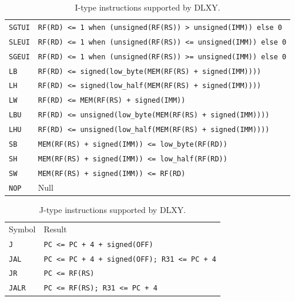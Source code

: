 \begin{table}[ht]
\begin{tabular}{ll}
		\rowcolor{gray!25}
		\texttt{SGTUI} & \texttt{RF(RD) <= 1 when (unsigned(RF(RS)) > unsigned(IMM)) else 0} \\
		\texttt{SLEUI} & \texttt{RF(RD) <= 1 when (unsigned(RF(RS)) <= unsigned(IMM)) else 0} \\
		\rowcolor{gray!25}
		\texttt{SGEUI} & \texttt{RF(RD) <= 1 when (unsigned(RF(RS)) >= unsigned(IMM)) else 0} \\
		\texttt{LB} & \texttt{RF(RD) <= signed(low\_byte(MEM(RF(RS) + signed(IMM))))} \\
		\rowcolor{gray!25}
		\texttt{LH} & \texttt{RF(RD) <= signed(low\_half(MEM(RF(RS) + signed(IMM))))} \\
		\texttt{LW} & \texttt{RF(RD) <= MEM(RF(RS) + signed(IMM))} \\
		\rowcolor{gray!25}
		\texttt{LBU} & \texttt{RF(RD) <= unsigned(low\_byte(MEM(RF(RS) + signed(IMM))))} \\
		\texttt{LHU} & \texttt{RF(RD) <= unsigned(low\_half(MEM(RF(RS) + signed(IMM))))} \\
		\rowcolor{gray!25}
		\texttt{SB} & \texttt{MEM(RF(RS) + signed(IMM)) <= low\_byte(RF(RD))} \\
		\texttt{SH} & \texttt{MEM(RF(RS) + signed(IMM)) <= low\_half(RF(RD))} \\
		\rowcolor{gray!25}
		\texttt{SW} & \texttt{MEM(RF(RS) + signed(IMM)) <= RF(RD)} \\
		\texttt{NOP} & Null \\
		\hline
	\end{tabular}
	\caption{I-type instructions supported by DLXY.}
	\label{tab:i_type_inst}
\end{table}

\begin{table}[ht]
	\centering
	\begin{tabular}{ll}
		\hline
		\rowcolor{gray!50}
		Symbol & Result \\
		\texttt{J} & \texttt{PC <= PC + 4 + signed(OFF)} \\
		\rowcolor{gray!25}
		\texttt{JAL} & \texttt{PC <= PC + 4 + signed(OFF); R31 <= PC + 4} \\
		\texttt{JR} & \texttt{PC <= RF(RS)} \\
		\rowcolor{gray!25}
		\texttt{JALR} & \texttt{PC <= RF(RS); R31 <= PC + 4} \\
		\hline
	\end{tabular}
	\caption{J-type instructions supported by DLXY.}
	\label{tab:j_type_inst}
\end{table}

